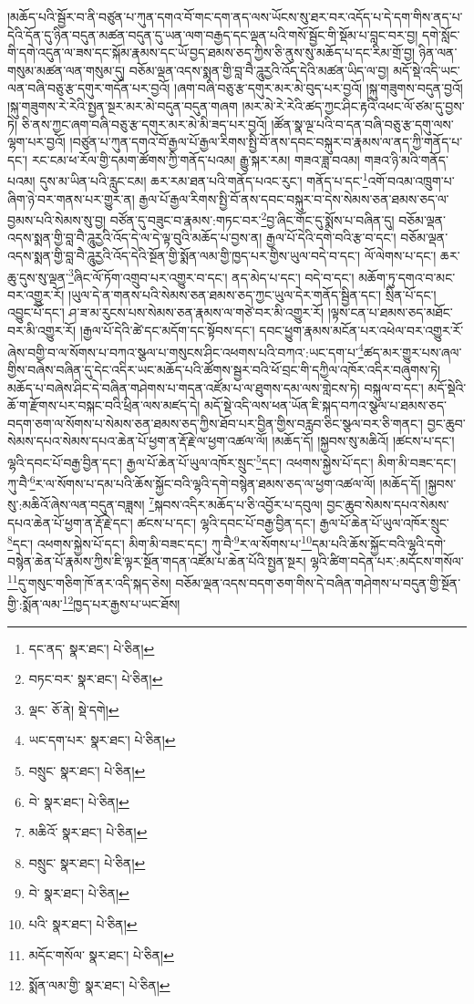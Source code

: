 །མཆོད་པའི་སྦྱོར་བ་ནི་བཙུན་པ་ཀུན་དགའ་བོ་གང་དག་ནད་ལས་ཡོངས་སུ་ཐར་བར་འདོད་པ་དེ་དག་གིས་ནད་པ་དེའི་དོན་དུ་ཉིན་བདུན་མཚན་བདུན་དུ་ཡན་ལག་བརྒྱད་དང་ལྡན་པའི་གསོ་སྦྱོང་གི་སྡོམ་པ་བླང་བར་བྱ། དགེ་སློང་གི་དགེ་འདུན་ལ་ཟས་དང་སྐོམ་རྣམས་དང་ཡོ་བྱད་ཐམས་ཅད་ཀྱིས་ཅི་ནུས་སུ་མཆོད་པ་དང་རིམ་གྲོ་བྱ། ཉིན་ལན་གསུམ་མཚན་ལན་གསུམ་དུ། བཅོམ་ལྡན་འདས་སྨན་གྱི་བླ་བཻ་ཌཱུརྱའི་འོད་དེའི་མཚན་ཡིད་ལ་བྱ། མདོ་སྡེ་འདི་ཡང་ལན་བཞི་བཅུ་རྩ་དགུར་གདོན་པར་བྱའོ། །ཞག་བཞི་བཅུ་རྩ་དགུར་མར་མེ་བུད་པར་བྱའོ། །སྐུ་གཟུགས་བདུན་བྱའོ། །སྐུ་གཟུགས་རེ་རེའི་སྤྱན་སྔར་མར་མེ་བདུན་བདུན་གཞག །མར་མེ་རེ་རེའི་ཚད་ཀྱང་ཤིང་རྟའི་འཕང་ལོ་ཙམ་དུ་བྱས་ཏེ། ཅི་ནས་ཀྱང་ཞག་བཞི་བཅུ་རྩ་དགུར་མར་མེ་མི་ཟད་པར་བྱའོ། །ཚོན་སྣ་ལྔ་པའི་བ་དན་བཞི་བཅུ་རྩ་དགུ་ལས་ལྷག་པར་བྱའོ། །བཙུན་པ་ཀུན་དགའ་བོ་རྒྱལ་པོ་རྒྱལ་རིགས་སྤྱི་བོ་ནས་དབང་བསྐུར་བ་རྣམས་ལ་ནད་ཀྱི་གནོད་པ་དང་། རང་ངམ་ཕ་རོལ་གྱི་དམག་ཚོགས་ཀྱི་གནོད་པའམ། རྒྱུ་སྐར་རམ། གཟའ་ཟླ་བའམ། གཟའ་ཉི་མའི་གནོད་པའམ། དུས་མ་ཡིན་པའི་རླུང་ངམ། ཆར་རམ་ཐན་པའི་གནོད་པའང་རུང་། གནོད་པ་དང་\footnote{དང་ནད་  སྣར་ཐང་།  པེ་ཅིན། }འགོ་བའམ་འཁྲུག་པ་ཞིག་ཉེ་བར་གནས་པར་གྱུར་ན། རྒྱལ་པོ་རྒྱལ་རིགས་སྤྱི་བོ་ནས་དབང་བསྐུར་བ་དེས་སེམས་ཅན་ཐམས་ཅད་ལ་བྱམས་པའི་སེམས་སུ་བྱ། བཙོན་དུ་བཟུང་བ་རྣམས་:གཏང་བར་\footnote{བཏང་བར་  སྣར་ཐང་།  པེ་ཅིན། }བྱ་ཞིང་གོང་དུ་སྨོས་པ་བཞིན་དུ། བཅོམ་ལྡན་འདས་སྨན་གྱི་བླ་བཻ་ཌཱུརྱའི་འོད་དེ་ལ་དེ་ལྟ་བུའི་མཆོད་པ་བྱས་ན། རྒྱལ་པོ་དེའི་དགེ་བའི་རྩ་བ་དང་། བཅོམ་ལྡན་འདས་སྨན་གྱི་བླ་བཻ་ཌཱུརྱའི་འོད་དེའི་སྔོན་གྱི་སྨོན་ལམ་གྱི་ཁྱད་པར་གྱིས་ཡུལ་བདེ་བ་དང་། ལོ་ལེགས་པ་དང་། ཆར་ཆུ་དུས་སུ་ལྡན་\footnote{ལྡང་  ཅོ་ནེ།  སྡེ་དགེ། }ཞིང་ལོ་ཏོག་འགྲུབ་པར་འགྱུར་བ་དང་། ནད་མེད་པ་དང་། བདེ་བ་དང་། མཆོག་ཏུ་དགའ་བ་མང་བར་འགྱུར་རོ། །ཡུལ་དེ་ན་གནས་པའི་སེམས་ཅན་ཐམས་ཅད་ཀྱང་ཡུལ་དེར་གནོད་སྦྱིན་དང་། སྲིན་པོ་དང་། འབྱུང་པོ་དང་། ཤ་ཟ་མ་རུངས་པས་སེམས་ཅན་རྣམས་ལ་གཙེ་བར་མི་འགྱུར་རོ། །ལྟས་ངན་པ་ཐམས་ཅད་མཐོང་བར་མི་འགྱུར་རོ། །རྒྱལ་པོ་དེའི་ཚེ་དང་མདོག་དང་སྟོབས་དང་། དབང་ཕྱུག་རྣམས་མངོན་པར་འཕེལ་བར་འགྱུར་རོ་ཞེས་བགྱི་བ་ལ་སོགས་པ་བཀའ་སྩལ་པ་གསུངས་ཤིང་འཕགས་པའི་བཀའ་:ཡང་དག་པ་\footnote{ཡང་དག་པར་  སྣར་ཐང་།  པེ་ཅིན། }ཚད་མར་གྱུར་པས་ཞལ་གྱིས་བཞེས་བཞིན་དུ་དེང་འདིར་ཡང་མཆོད་པའི་ཚོགས་སྦྱར་བའི་ཕོ་བྲང་གི་དཀྱིལ་འཁོར་འདིར་བཞུགས་ཏེ། མཆོད་པ་བཞེས་ཤིང་དེ་བཞིན་གཤེགས་པ་གདན་འཛོམ་པ་ལ་ཐུགས་དམ་ལས་གླེངས་ཏེ། བསྐུལ་བ་དང་། མདོ་སྡེའི་ཆོ་ག་རྫོགས་པར་བསྐང་བའི་ཕྲིན་ལས་མཛད་དེ། མདོ་སྡེ་འདི་ལས་ཕན་ཡོན་ཇི་སྐད་བཀའ་སྩལ་པ་ཐམས་ཅད་བདག་ཅག་ལ་སོགས་པ་སེམས་ཅན་ཐམས་ཅད་ཀྱིས་ཐོབ་པར་བྱིན་གྱིས་བརླབ་ཅིང་སྩལ་བར་ཅི་གནང་། བྱང་ཆུབ་སེམས་དཔའ་སེམས་དཔའ་ཆེན་པོ་ཕྱག་ན་རྡོ་རྗེ་ལ་ཕྱག་འཚལ་ལོ། །མཆོད་དོ། །སྐྱབས་སུ་མཆིའོ། །ཚངས་པ་དང་། ལྷའི་དབང་པོ་བརྒྱ་བྱིན་དང་། རྒྱལ་པོ་ཆེན་པོ་ཡུལ་འཁོར་སྲུང་\footnote{བསྲུང་  སྣར་ཐང་།  པེ་ཅིན། }དང་། འཕགས་སྐྱེས་པོ་དང་། མིག་མི་བཟང་དང་། ཀུ་བཻ་\footnote{བེ་  སྣར་ཐང་།  པེ་ཅིན། }ར་ལ་སོགས་པ་དམ་པའི་ཆོས་སྐྱོང་བའི་ལྷའི་དགེ་བསྙེན་ཐམས་ཅད་ལ་ཕྱག་འཚལ་ལོ། །མཆོད་དོ། །སྐྱབས་སུ་:མཆིའོ་ཞེས་ལན་བདུན་བཟླས། \footnote{མཆིའོ་  སྣར་ཐང་།  པེ་ཅིན། }སྐབས་འདིར་མཆོད་པ་ཅི་འབྱོར་པ་དབུལ། བྱང་ཆུབ་སེམས་དཔའ་སེམས་དཔའ་ཆེན་པོ་ཕྱག་ན་རྡོ་རྗེ་དང་། ཚངས་པ་དང་། ལྷའི་དབང་པོ་བརྒྱ་བྱིན་དང་། རྒྱལ་པོ་ཆེན་པོ་ཡུལ་འཁོར་སྲུང་\footnote{བསྲུང་  སྣར་ཐང་།  པེ་ཅིན། }དང་། འཕགས་སྐྱེས་པོ་དང་། མིག་མི་བཟང་དང་། ཀུ་བཻ་\footnote{བེ་  སྣར་ཐང་།  པེ་ཅིན། }ར་ལ་སོགས་པ་\footnote{པའི་  སྣར་ཐང་།  པེ་ཅིན། }དམ་པའི་ཆོས་སྐྱོང་བའི་ལྷའི་དགེ་བསྙེན་ཆེན་པོ་རྣམས་ཀྱིས་ཇི་ལྟར་སྔོན་གདན་འཛོམ་པ་ཆེན་པོའི་སྤྱན་སྔར། ལྷའི་ཚིག་བདེན་པར་:མདོངས་གསོལ་\footnote{མདོང་གསོལ་  སྣར་ཐང་།  པེ་ཅིན། }དུ་གསུང་གཅིག་ཁོ་ནར་འདི་སྐད་ཅེས། བཅོམ་ལྡན་འདས་བདག་ཅག་གིས་དེ་བཞིན་གཤེགས་པ་བདུན་གྱི་སྔོན་གྱི་:སྨོན་ལམ་\footnote{སྨོན་ལམ་གྱི་  སྣར་ཐང་།  པེ་ཅིན། }ཁྱད་པར་རྒྱས་པ་ཡང་ཐོས། 
